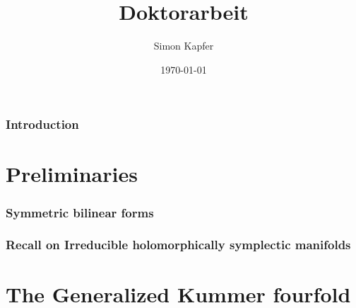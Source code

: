 \documentclass[a4paper]{article}
\begin{document}
\title{\bf Doktorarbeit}


\author{Simon Kapfer}


\date{\today}

\maketitle
\section{Introduction}
\part{Preliminaries}
\section{Symmetric bilinear forms}




\section{Recall on Irreducible holomorphically symplectic manifolds}


\part{The Generalized Kummer fourfold}\label{integralcohomology}





\end{document}
